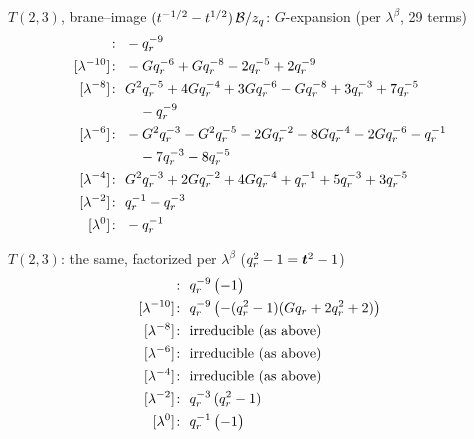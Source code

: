 $T(2,3)$, brane--image $(t^{-1/2} - t^{1/2})\,\mathcal{B}/z_q$: $G$-expansion (per $\lambda^\beta$, 29 terms)
\begin{align*}
[\lambda^{-12}]\colon\ & -\qr^{-9} \\
[\lambda^{-10}]\colon\ & -G \qr^{-6} +G \qr^{-8} -2 \qr^{-5} +2 \qr^{-9} \\
[\lambda^{-8}]\colon\ & G^{2} \qr^{-5} +4 G \qr^{-4} +3 G \qr^{-6} -G \qr^{-8} +3 \qr^{-3} +7 \qr^{-5} \\
& \quad -\qr^{-9} \\
[\lambda^{-6}]\colon\ & -G^{2} \qr^{-3} -G^{2} \qr^{-5} -2 G \qr^{-2} -8 G \qr^{-4} -2 G \qr^{-6} -\qr^{-1} \\
& \quad -7 \qr^{-3} -8 \qr^{-5} \\
[\lambda^{-4}]\colon\ & G^{2} \qr^{-3} +2 G \qr^{-2} +4 G \qr^{-4} +\qr^{-1} +5 \qr^{-3} +3 \qr^{-5} \\
[\lambda^{-2}]\colon\ & \qr^{-1} -\qr^{-3} \\
[\lambda^{0}]\colon\ & -\qr^{-1}
\end{align*}

$T(2,3)$: the same, factorized per $\lambda^\beta$ ($q_r^2 - 1 = \bm{t}^2 - 1$)
\begin{align*}
[\lambda^{-12}]\colon\ & \qr^{-9}\,\bigl(-1\bigr) \\
[\lambda^{-10}]\colon\ & \qr^{-9}\,\bigl(- (\qr^2 - 1)(G \qr + 2 \qr^{2} + 2)\bigr) \\
[\lambda^{-8}]\colon\ & \text{irreducible (as above)} \\
[\lambda^{-6}]\colon\ & \text{irreducible (as above)} \\
[\lambda^{-4}]\colon\ & \text{irreducible (as above)} \\
[\lambda^{-2}]\colon\ & \qr^{-3}\,(\qr^2 - 1) \\
[\lambda^{0}]\colon\ & \qr^{-1}\,\bigl(-1\bigr)
\end{align*}

